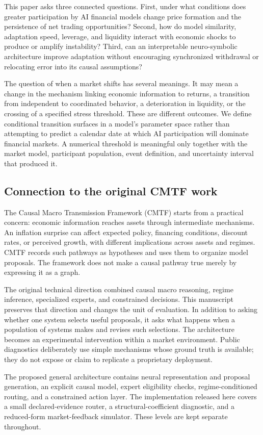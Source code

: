 This paper asks three connected questions. First, under what conditions does greater participation by AI financial models change price formation and the persistence of net trading opportunities? Second, how do model similarity, adaptation speed, leverage, and liquidity interact with economic shocks to produce or amplify instability? Third, can an interpretable neuro-symbolic architecture improve adaptation without encouraging synchronized withdrawal or relocating error into its causal assumptions?

The question of when a market shifts has several meanings. It may mean a change in the mechanism linking economic information to returns, a transition from independent to coordinated behavior, a deterioration in liquidity, or the crossing of a specified stress threshold. These are different outcomes. We define conditional transition surfaces in a model's parameter space rather than attempting to predict a calendar date at which AI participation will dominate financial markets. A numerical threshold is meaningful only together with the market model, participant population, event definition, and uncertainty interval that produced it.

\subsection{Connection to the original CMTF work}
The Causal Macro Transmission Framework (CMTF) starts from a practical concern: economic information reaches assets through intermediate mechanisms. An inflation surprise can affect expected policy, financing conditions, discount rates, or perceived growth, with different implications across assets and regimes. CMTF records such pathways as hypotheses and uses them to organize model proposals. The framework does not make a causal pathway true merely by expressing it as a graph.

The original technical direction combined causal macro reasoning, regime inference, specialized experts, and constrained decisions. This manuscript preserves that direction and changes the unit of evaluation. In addition to asking whether one system selects useful proposals, it asks what happens when a population of systems makes and revises such selections. The architecture becomes an experimental intervention within a market environment. Public diagnostics deliberately use simple mechanisms whose ground truth is available; they do not expose or claim to replicate a proprietary deployment.

The proposed general architecture contains neural representation and proposal generation, an explicit causal model, expert eligibility checks, regime-conditioned routing, and a constrained action layer. The implementation released here covers a small declared-evidence router, a structural-coefficient diagnostic, and a reduced-form market-feedback simulator. These levels are kept separate throughout.

